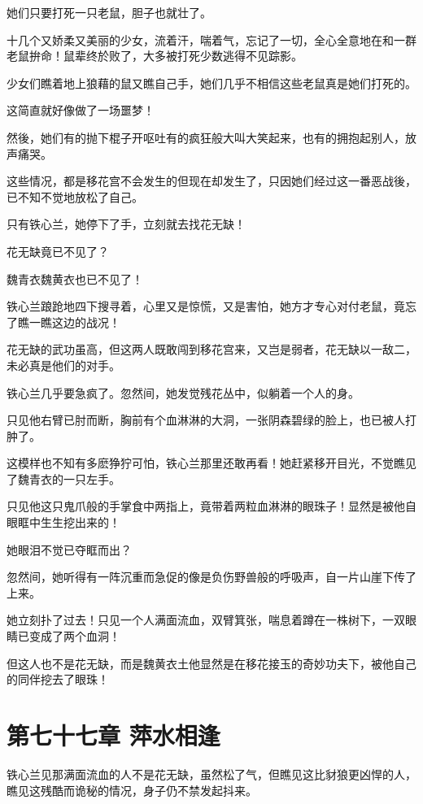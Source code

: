 \documentclass[12pt,oneside]{book}
\begin{document}
她们只要打死一只老鼠，胆子也就壮了。

十几个又娇柔又美丽的少女，流着汗，喘着气，忘记了一切，全心全意地在和一群老鼠拚命！鼠辈终於败了，大多被打死少数逃得不见踪影。

少女们瞧着地上狼藉的鼠又瞧自己手，她们几乎不相信这些老鼠真是她们打死的。

这简直就好像做了一场噩梦！

然後，她们有的抛下棍子开呕吐有的疯狂般大叫大笑起来，也有的拥抱起别人，放声痛哭。

这些情况，都是移花宫不会发生的但现在却发生了，只因她们经过这一番恶战後，已不知不觉地放松了自己。

只有铁心兰，她停下了手，立刻就去找花无缺！

花无缺竟已不见了？

魏青衣魏黄衣也已不见了！

铁心兰踉跄地四下搜寻着，心里又是惊慌，又是害怕，她方才专心对付老鼠，竟忘了瞧一瞧这边的战况！

花无缺的武功虽高，但这两人既敢闯到移花宫来，又岂是弱者，花无缺以一敌二，未必真是他们的对手。

铁心兰几乎要急疯了。忽然间，她发觉残花丛中，似躺着一个人的身。

只见他右臂已肘而断，胸前有个血淋淋的大洞，一张阴森碧绿的脸上，也已被人打肿了。

这模样也不知有多麽狰狞可怕，铁心兰那里还敢再看！她赶紧移开目光，不觉瞧见了魏青衣的一只左手。

只见他这只鬼爪般的手掌食中两指上，竟带着两粒血淋淋的眼珠子！显然是被他自眼眶中生生挖出来的！

她眼泪不觉已夺眶而出？

忽然间，她听得有一阵沉重而急促的像是负伤野兽般的呼吸声，自一片山崖下传了上来。

她立刻扑了过去！只见一个人满面流血，双臂箕张，喘息着蹲在一株树下，一双眼睛已变成了两个血洞！

但这人也不是花无缺，而是魏黄衣土他显然是在移花接玉的奇妙功夫下，被他自己的同伴挖去了眼珠！

\hypertarget{ux7b2cux4e03ux5341ux4e03ux7ae0-ux840dux6c34ux76f8ux9022}{%
\chapter{第七十七章
萍水相逢}\label{ux7b2cux4e03ux5341ux4e03ux7ae0-ux840dux6c34ux76f8ux9022}}

铁心兰见那满面流血的人不是花无缺，虽然松了气，但瞧见这比豺狼更凶悍的人，瞧见这残酷而诡秘的情况，身子仍不禁发起抖来。
\end{document}
